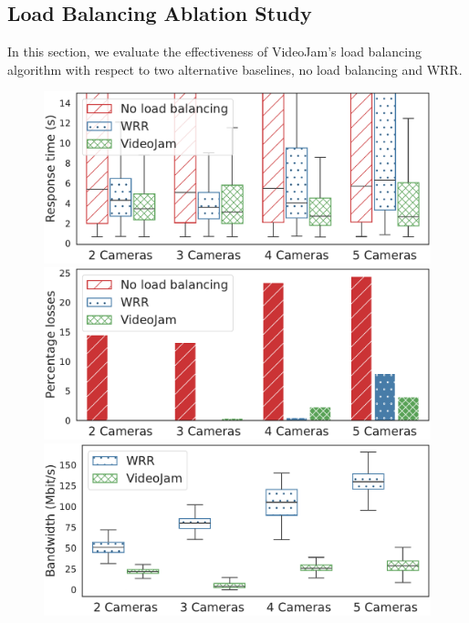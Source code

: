 \subsection{Load Balancing Ablation Study}

In this section, we evaluate the effectiveness of VideoJam's load balancing algorithm with respect to two alternative baselines, no load balancing and WRR.

\begin{figure}[htb]
	\centering
	\begin{minipage}[t]{.3\linewidth}
		\centering
		\includegraphics[width=\linewidth]{chapters/videojam/images/agains_weighted_roundrobin/response_time.pdf}
	\end{minipage}
	\hfill
	\begin{minipage}[t]{.3\linewidth}
		\centering
		\includegraphics[width=\linewidth]{chapters/videojam/images/agains_weighted_roundrobin/percentage_losses.pdf}
	\end{minipage}
	\hfill
	\begin{minipage}[t]{.3\linewidth}
		\centering
		\includegraphics[width=\linewidth]{chapters/videojam/images/agains_weighted_roundrobin/bandwidth.pdf}

\end{minipage}
\end{figure}
